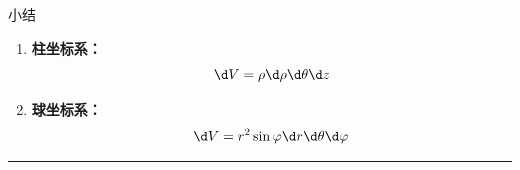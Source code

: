\begin{frame}[<+->]{小结}
	\linespread{1.2}
	\begin{enumerate}
	  \item {\bf 柱坐标系：}
	  $$\d V=\rho \d\rho \d\theta \d z$$
	  \item {\bf 球坐标系：}
	  $$\d V=r^2\sin\varphi \d r\d\theta \d\varphi$$
	\end{enumerate}
	\pause \hrule
	\bigskip
	\centerline{}
\end{frame}

 
% 
